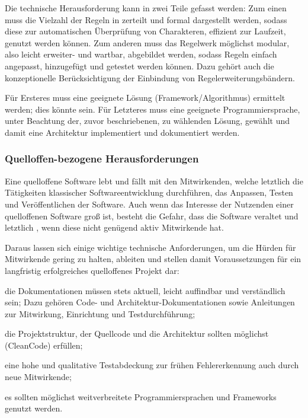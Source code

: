 Die technische Herausforderung kann in zwei Teile gefasst werden:
Zum einen muss die Vielzahl der Regeln in  zerteilt und formal dargestellt werden, sodass diese zur automatischen Überprüfung von Charakteren, effizient zur Laufzeit, genutzt werden können.
Zum anderen muss das Regelwerk möglichst modular, also leicht erweiter- und wartbar, abgebildet werden, sodass Regeln einfach angepasst, hinzugefügt und getestet werden können.
Dazu gehört auch die konzeptionelle Berücksichtigung der Einbindung von Regelerweiterungsbändern.

Für Ersteres muss eine geeignete Lösung (Framework/Algorithmus) ermittelt werden; dies könnte \zB {} sein.
Für Letzteres muss eine geeignete Programmiersprache, unter Beachtung der, zuvor beschriebenen, zu wählenden Lösung, gewählt und damit eine  Architektur implementiert und dokumentiert werden.


\subsubsection{Quelloffen-bezogene Herausforderungen}
\label{subsubsec:quelloffen-bezogene-herausforderungen}

Eine quelloffene Software lebt und fällt mit den \sog Mitwirkenden, welche letztlich die Tätigkeiten klassischer Softwareentwicklung durchführen, \zB das Anpassen, Testen und Veröffentlichen der Software.
Auch wenn das Interesse der Nutzenden einer quelloffenen Software groß ist, besteht die Gefahr, dass die Software veraltet und letztlich , wenn diese nicht genügend aktiv Mitwirkende hat.

Daraus lassen sich einige wichtige technische Anforderungen, um die Hürden für Mitwirkende gering zu halten, ableiten und stellen damit Voraussetzungen für ein langfristig erfolgreiches quelloffenes Projekt dar:
\begin{inparaenum}
    [a)]
    \item die Dokumentationen müssen stets aktuell, leicht auffindbar und verständlich sein;
    Dazu gehören \uA Code- und Architektur-Dokumentationen sowie Anleitungen zur Mitwirkung, Einrichtung und Testdurchführung;
    \item die Projektstruktur, der Quellcode und die Architektur sollten möglichst  (\zB CleanCode) erfüllen;
    \item eine hohe und qualitative Testabdeckung zur frühen Fehlererkennung auch durch neue Mitwirkende;
    \item es sollten möglichst weitverbreitete Programmiersprachen und Frameworks genutzt werden.
\end{inparaenum}


